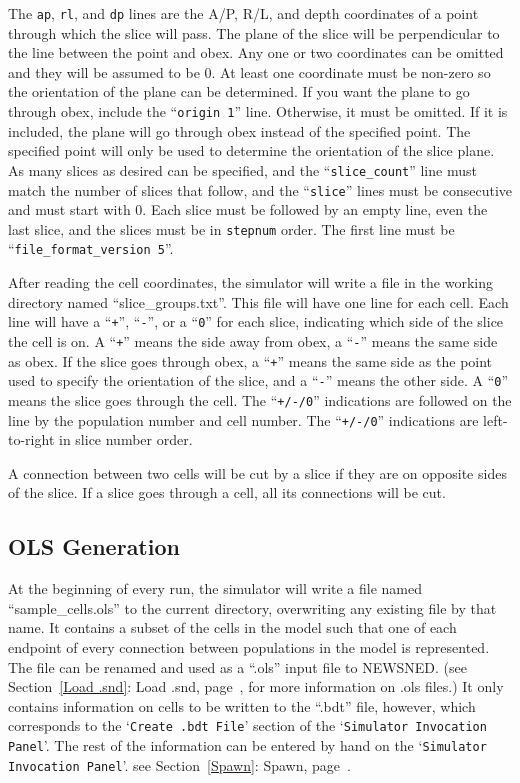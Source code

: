 \documentclass[12pt,openany,oneside]{book}
\newcommand{\ticode}[1]{\texttt{#1}}
\newcommand{\tisamp}[1]{`\texttt{#1}'}
\newcommand{\tixref}[1]{see Section~\ref{#1}: #1, page~\pageref{#1}}
\begin{document}
\noindent
The \ticode{ap}, \ticode{rl}, and \ticode{dp} lines are the A/P, R/L,
and depth coordinates of a point through which the slice will pass.
The plane of the slice will be perpendicular to the line between the
point and obex.  Any one or two coordinates can be omitted and they
will be assumed to be 0.  At least one coordinate must be non-zero so
the orientation of the plane can be determined.  If you want the plane
to go through obex, include the ``\ticode{origin 1}'' line.
Otherwise, it must be omitted.  If it is included, the plane will go
through obex instead of the specified point.  The specified point will
only be used to determine the orientation of the slice plane. As many
slices as desired can be specified, and the ``\ticode{slice\_count}''
line must match the number of slices that follow, and the
``\ticode{slice}'' lines must be consecutive and must start with 0.
Each slice must be followed by an empty line, even the last slice, and
the slices must be in \verb~stepnum~ order.  The first line must be
``\ticode{file\_format\_version 5}''.

After reading the cell coordinates, the simulator will write a file in
the working directory named ``slice\_groups.txt''.  This file will have
one line for each cell.  Each line will have a ``\ticode{+}'',
``\ticode{-}'', or a ``\ticode{0}'' for each slice, indicating which side of
the slice the cell is on.  A ``\ticode{+}'' means the side away from
obex, a ``\ticode{-}'' means the same side as obex.  If the slice goes
through obex, a ``\ticode{+}'' means the same side as the point used to
specify the orientation of the slice, and a ``\ticode{-}'' means the
other side.  A ``\ticode{0}'' means the slice goes through the cell.  The
``\ticode{+/-/0}'' indications are followed on the line by the population
number and cell number.  The ``\ticode{+/-/0}'' indications are
left-to-right in slice number order.

A connection between two cells will be cut by a slice if they are on
opposite sides of the slice.  If a slice goes through a cell, all its
connections will be cut.

\subsection{OLS Generation}

At the beginning of every run, the simulator will write a file named
``sample\_cells.ols'' to the current directory, overwriting any
existing file by that name.  It contains a subset of the cells in the
model such that one of each endpoint of every connection between
populations in the model is represented.  The file can be renamed and
used as a ``.ols'' input file to NEWSNED.  (\tixref{Load .snd},
for more information on .ols files.)  It only contains information on
cells to be written to the ``.bdt'' file, however, which corresponds
to the \tisamp{Create .bdt File} section of the \tisamp{Simulator
Invocation Panel}.  The rest of the information can be entered by hand
on the \tisamp{Simulator Invocation Panel}.  \tixref{Spawn}.
\end{document}
